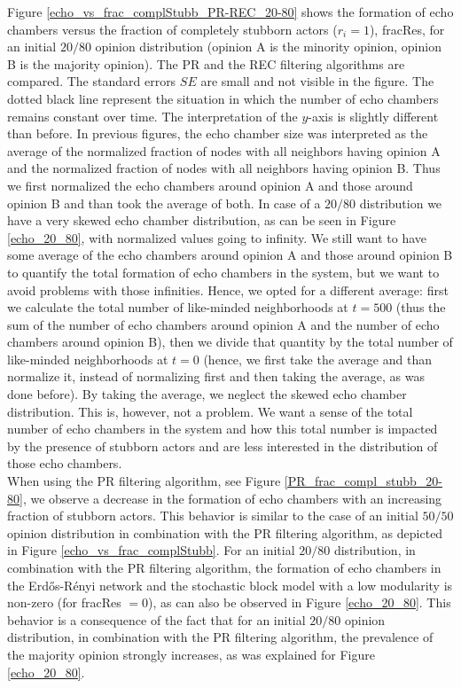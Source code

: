 \documentclass[11 pt , letterpaper , twoside , openright]{book}
\begin{document}
\noindent
Figure \ref{echo_vs_frac_complStubb_PR-REC_20-80} shows the formation of echo chambers versus the fraction of completely stubborn actors ($r_i = 1$), fracRes, for an initial $20/80$ opinion distribution (opinion A is the minority opinion, opinion B is the majority opinion). The PR and the REC filtering algorithms are compared. The standard errors $SE$ are small and not visible in the figure. The dotted black line represent the situation in which the number of echo chambers remains constant over time. The interpretation of the $y$-axis is slightly different than before. In previous figures, the echo chamber size was interpreted as the average of the normalized fraction of nodes with all neighbors having opinion A and the normalized fraction of nodes with all neighbors having opinion B. Thus we first normalized the echo chambers around opinion A and those around opinion B and than took the average of both. In case of a $20/80$ distribution we have a very skewed echo chamber distribution, as can be seen in Figure \ref{echo_20_80}, with normalized values going to infinity. We still want to have some average of the echo chambers around opinion A and those around opinion B to quantify the total formation of echo chambers in the system, but we want to avoid problems with those infinities. Hence, we opted for a different average: first we calculate the total number of like-minded neighborhoods at $t=500$ (thus the sum of the number of echo chambers around opinion A and the number of echo chambers around opinion B), then we divide that quantity by the total number of like-minded neighborhoods at $t=0$ (hence, we first take the average and than normalize it, instead of normalizing first and then taking the average, as was done before). By taking the average, we neglect the skewed echo chamber distribution. This is, however, not a problem. We want a sense of the total number of echo chambers in the system and how this total number is impacted by the presence of stubborn actors and are less interested in the distribution of those echo chambers. \\
\newline
When using the PR filtering algorithm, see Figure \ref{PR_frac_compl_stubb_20-80}, we observe a decrease in the formation of echo chambers with an increasing fraction of stubborn actors. This behavior is similar to the case of an initial $50/50$ opinion distribution in combination with the PR filtering algorithm, as depicted in Figure \ref{echo_vs_frac_complStubb}. For an initial $20/80$ distribution, in combination with the PR filtering algorithm, the formation of echo chambers in the Erd\H{o}s-R\'{e}nyi network and the stochastic block model with a low modularity is non-zero (for fracRes $=0$), as can also be observed in Figure \ref{echo_20_80}. This behavior is a consequence of the fact that for an initial $20/80$ opinion distribution, in combination with the PR filtering algorithm, the prevalence of the majority opinion strongly increases, as was explained for Figure \ref{echo_20_80}. \\
\end{document}
